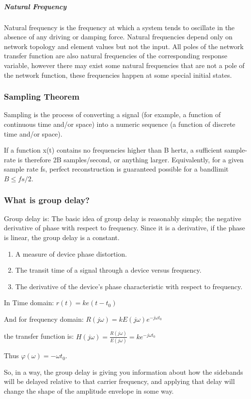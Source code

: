 \subparagraph{Natural Frequency} Natural frequency is the frequency at which a system tends to oscillate in the absence of any driving or damping force. Natural frequencies depend only on network topology and element values but not the input. All poles of the network transfer function are also natural frequencies of the corresponding response variable, however there may exist some natural frequencies that are not a pole of the network function, these frequencies happen at some special initial states.

\subsubsection{Sampling Theorem}
Sampling is the process of converting a signal (for example, a function of continuous time and/or space) into a numeric sequence (a function of discrete time and/or space).

If a function x(t) contains no frequencies higher than B hertz, a sufficient sample-rate is therefore 2B samples/second, or anything larger. Equivalently, for a given sample rate fs, perfect reconstruction is guaranteed possible for a bandlimit $B \leq fs/2$.

\subsubsection{What is group delay?}
Group delay is:
The basic idea of group delay is reasonably simple; the negative derivative of phase with respect to frequency. Since it is a derivative, if the phase is linear, the group delay is a constant.
\begin{enumerate}
  \item A measure of device phase distortion.
  \item The transit time of a signal through a device versus frequency.
  \item The derivative of the device's phase characteristic with respect to frequency.
\end{enumerate}

In Time domain: $r(t)=ke(t-t_0)$

And for frequency domain: $R(j\omega)=kE(j\omega)e^{-j\omega t_0}$

the transfer function is: $H(j\omega)=\frac{R(j\omega)}{E(j\omega)}=ke^{-j\omega t_0}$

Thus $\varphi(\omega)=-\omega t_0$.

So, in a way, the group delay is giving you information about how the sidebands will be delayed relative to that carrier frequency, and applying that delay will change the shape of the amplitude envelope in some way.


